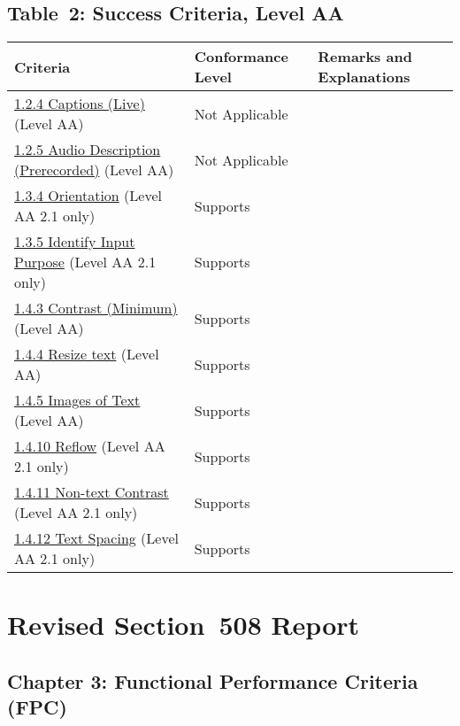 \documentclass{report}
\begin{document}
\subsection{Table~2:  Success Criteria, Level AA}
\begin{longtable}{p{}<{\RaggedRight}p{}<{\RaggedRight}p{}<{\RaggedRight}}
  \toprule
  Criteria & Conformance Level & Remarks and Explanations \\
  \midrule
  \endhead
  \bottomrule
  \endfoot
  \href{http://www.w3.org/TR/WCAG20/#media-equiv-real-time-captions}{1.2.4
  Captions (Live)} (Level AA) & Not Applicable\\
  \href{http://www.w3.org/TR/WCAG20/#media-equiv-audio-desc-only}{1.2.5
  Audio Description (Prerecorded)} (Level AA) & Not Applicable\\
  \href{https://www.w3.org/TR/WCAG21/#orientation}{1.3.4 Orientation}
  (Level AA 2.1 only) & Supports\\
  \href{https://www.w3.org/TR/WCAG21/#identify-input-purpose}{1.3.5
  Identify Input Purpose} (Level AA 2.1 only) & Supports\\
  \href{http://www.w3.org/TR/WCAG20/#visual-audio-contrast-contrast}{1.4.3
  Contrast (Minimum)} (Level AA) & Supports\\
  \href{https://www.w3.org/TR/WCAG21/#resize-text}{1.4.4 Resize text}
  (Level AA) & Supports\\
  \href{http://www.w3.org/TR/WCAG20/#visual-audio-contrast-text-presentation}{1.4.5
  Images of Text} (Level AA) & Supports\\
  \href{https://www.w3.org/TR/WCAG21/#reflow}{1.4.10 Reflow} (Level AA
  2.1 only) & Supports\\
  \href{https://www.w3.org/TR/WCAG21/#non-text-contrast}{1.4.11
  Non-text Contrast} (Level AA 2.1 only) & Supports\\
  \href{https://www.w3.org/TR/WCAG21/#text-spacing}{1.4.12 Text
  Spacing} (Level AA 2.1 only) & Supports\\
  
\end{longtable}


\section{Revised Section~508 Report}
\label{sec:sec508}

\subsection{Chapter 3: Functional Performance Criteria (FPC)}
\label{sec:508-3}
\end{document}
